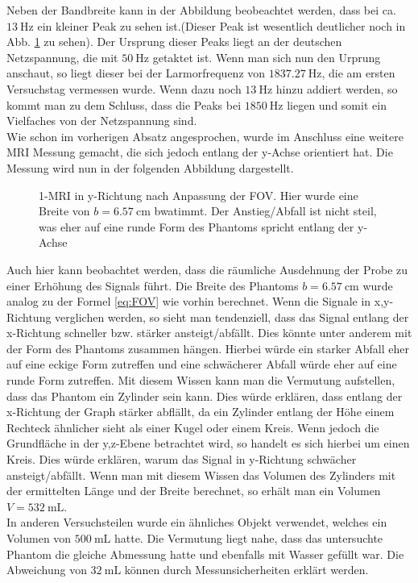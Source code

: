 Neben der Bandbreite kann in der Abbildung beobeachtet werden, dass bei ca. $\SI{13}{\hertz}$ ein kleiner Peak zu sehen ist.(Dieser Peak ist wesentlich deutlicher noch in Abb. \ref{fig:1Dy} zu sehen). Der Ursprung dieser Peaks liegt an der deutschen Netzspannung, die mit $\SI{50}{\hertz}$ getaktet ist. Wenn man sich nun den Urprung anschaut, so liegt dieser bei der Larmorfrequenz von $\SI{1837,27}{\hertz}$, die am ersten Versuchstag vermessen wurde. Wenn dazu noch $\SI{13}{\hertz}$ hinzu addiert werden, so  kommt man zu dem Schluss, dass die Peaks bei $\SI{1850}{\hertz}$ liegen und somit ein Vielfaches von der Netzspannung sind.\\
Wie schon im vorherigen Absatz angesprochen, wurde im Anschluss eine weitere MRI Messung gemacht, die sich jedoch entlang der y-Achse orientiert hat. Die Messung wird nun in der folgenden Abbildung dargestellt.
\begin{figure}[H]
    \centering
    
    \caption[1-MRI in y-Richtung nach Anpassung der FOV]{1-MRI in y-Richtung nach Anpassung der FOV. Hier wurde eine Breite von $b=\SI{6,57}{\centi \m}$ bwatimmt. Der Anstieg/Abfall ist nicht steil, was eher auf eine runde Form des Phantoms spricht entlang der y-Achse}\label{fig:1Dy}
\end{figure} 
Auch hier kann beobachtet werden, dass die räumliche Ausdehnung der Probe zu einer Erhöhung des Signals führt. Die Breite des Phantoms $b=\SI{6,57}{\centi \m}$ wurde analog zu der Formel \ref{eq:FOV} wie vorhin berechnet. Wenn die Signale in x,y-Richtung verglichen werden, so sieht man tendenziell, dass das Signal entlang der x-Richtung schneller bzw. stärker ansteigt/abfällt. Dies könnte unter anderem mit der Form des Phantoms zusammen hängen. Hierbei würde ein starker Abfall eher auf eine eckige Form zutreffen und eine schwächerer Abfall würde eher auf eine runde Form zutreffen. Mit diesem Wissen kann man die Vermutung aufstellen, dass das Phantom ein Zylinder sein kann. Dies würde erklären, dass entlang der x-Richtung der Graph stärker abflällt, da ein Zylinder entlang der Höhe einem Rechteck ähnlicher sieht als einer Kugel oder einem Kreis. Wenn jedoch die Grundfläche in der y,z-Ebene betrachtet wird, so handelt es sich hierbei um einen Kreis. Dies würde erklären, warum das Signal in y-Richtung schwächer ansteigt/abfällt. Wenn man mit diesem Wissen das Volumen des Zylinders mit der ermittelten Länge und der Breite berechnet, so erhält man ein Volumen $V=\SI{532}{\milli\liter}$.\\
In anderen Versuchsteilen wurde ein ähnliches Objekt verwendet, welches ein Volumen von $\SI{500}{\milli \liter}$ hatte. Die Vermutung liegt nahe, dass das untersuchte Phantom die gleiche Abmessung hatte und ebenfalls mit Wasser gefüllt war. Die Abweichung von $\SI{32}{\milli\liter}$ können durch Messunsicherheiten erklärt werden.\\
